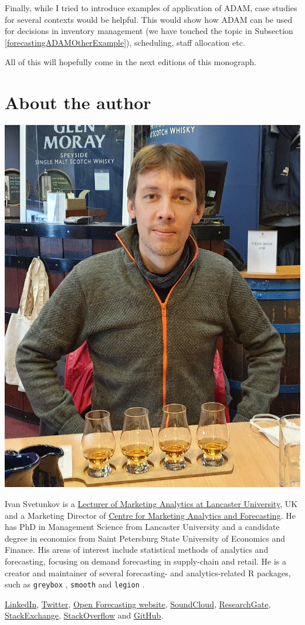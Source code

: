 \documentclass[]{book}
\theoremstyle{definition}
\theoremstyle{definition}
\theoremstyle{definition}
\theoremstyle{definition}
\theoremstyle{remark}
\begin{document}
Finally, while I tried to introduce examples of application of ADAM, case studies for several contexts would be helpful. This would show how ADAM can be used for decisions in inventory management (we have touched the topic in Subsection \ref{forecastingADAMOtherExample}), scheduling, staff allocation etc.

All of this will hopefully come in the next editions of this monograph.

\hypertarget{about-the-author}{%
\chapter*{About the author}\label{about-the-author}}

\begin{center}\includegraphics[width=0.6\linewidth]{images/IvanSvetunkov-web} \end{center}

Ivan Svetunkov is a \href{https://www.lancaster.ac.uk/lums/people/ivan-svetunkov}{Lecturer of Marketing Analytics at Lancaster University}, UK and a Marketing Director of \href{https://www.lancaster.ac.uk/lums/cmaf/}{Centre for Marketing Analytics and Forecasting}. He has PhD in Management Science from Lancaster University and a candidate degree in economics from Saint Petersburg State University of Economics and Finance. His areas of interest include statistical methods of analytics and forecasting, focusing on demand forecasting in supply-chain and retail. He is a creator and maintainer of several forecasting- and analytics-related R packages, such as \texttt{greybox} \citep{R-greybox}, \texttt{smooth} \citep{R-smooth} and \texttt{legion} \citep{R-legion}.

\href{https://www.linkedin.com/in/isvetunkov/}{LinkedIn}, \href{https://twitter.com/iSvetunkov}{Twitter}, \href{https://forecasting.svetunkov.ru/}{Open Forecasting website}, \href{https://soundcloud.com/h0-band}{SoundCloud}, \href{https://www.researchgate.net/profile/Ivan_Svetunkov}{ResearchGate}, \href{http://stats.stackexchange.com/users/87585/ivan-svetunkov}{StackExchange}, \href{http://stackoverflow.com/users/5296618/ivan-svetunkov}{StackOverflow} and \href{https://github.com/config-i1}{GitHub}.


\end{document}
